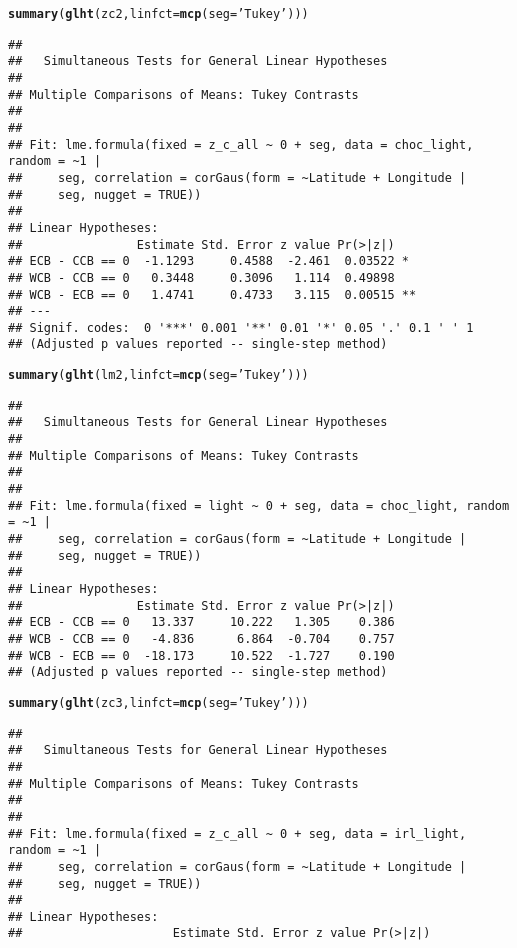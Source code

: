 \documentclass[letterpaper,12pt]{article}\usepackage[]{graphicx}\usepackage[]{color}
\makeatletter
\newcommand{\hlstr}[1]{\textcolor[rgb]{0.192,0.494,0.8}{#1}}%
\newcommand{\hlstd}[1]{\textcolor[rgb]{0.345,0.345,0.345}{#1}}%
\newcommand{\hlkwc}[1]{\textcolor[rgb]{0.333,0.667,0.333}{#1}}%
\newcommand{\hlkwd}[1]{\textcolor[rgb]{0.737,0.353,0.396}{\textbf{#1}}}%
\newenvironment{kframe}{%
 \def\at@end@of@kframe{}%
 \ifinner\ifhmode%
  \def\at@end@of@kframe{\end{minipage}}%
  \begin{minipage}{\columnwidth}%
 \fi\fi%
 \def\FrameCommand##1{\hskip\@totalleftmargin \hskip-\fboxsep
 \colorbox{shadecolor}{##1}\hskip-\fboxsep
     \hskip-\linewidth \hskip-\@totalleftmargin \hskip\columnwidth}%
 \MakeFramed {\advance\hsize-\width
   \@totalleftmargin\z@ \linewidth\hsize
   \@setminipage}}%
 {\par\unskip\endMakeFramed%
 \at@end@of@kframe}
\newenvironment{knitrout}{}{} %
\makeatother
\begin{document}
\begin{knitrout}
\begin{kframe}
\begin{alltt}
\hlkwd{summary}\hlstd{(}\hlkwd{glht}\hlstd{(zc2,} \hlkwc{linfct} \hlstd{=} \hlkwd{mcp}\hlstd{(}\hlkwc{seg} \hlstd{=} \hlstr{'Tukey'}\hlstd{)))}
\end{alltt}
\begin{verbatim}
## 
## 	 Simultaneous Tests for General Linear Hypotheses
## 
## Multiple Comparisons of Means: Tukey Contrasts
## 
## 
## Fit: lme.formula(fixed = z_c_all ~ 0 + seg, data = choc_light, random = ~1 | 
##     seg, correlation = corGaus(form = ~Latitude + Longitude | 
##     seg, nugget = TRUE))
## 
## Linear Hypotheses:
##                Estimate Std. Error z value Pr(>|z|)   
## ECB - CCB == 0  -1.1293     0.4588  -2.461  0.03522 * 
## WCB - CCB == 0   0.3448     0.3096   1.114  0.49898   
## WCB - ECB == 0   1.4741     0.4733   3.115  0.00515 **
## ---
## Signif. codes:  0 '***' 0.001 '**' 0.01 '*' 0.05 '.' 0.1 ' ' 1
## (Adjusted p values reported -- single-step method)
\end{verbatim}
\begin{alltt}
\hlkwd{summary}\hlstd{(}\hlkwd{glht}\hlstd{(lm2,} \hlkwc{linfct} \hlstd{=} \hlkwd{mcp}\hlstd{(}\hlkwc{seg} \hlstd{=} \hlstr{'Tukey'}\hlstd{)))}
\end{alltt}
\begin{verbatim}
## 
## 	 Simultaneous Tests for General Linear Hypotheses
## 
## Multiple Comparisons of Means: Tukey Contrasts
## 
## 
## Fit: lme.formula(fixed = light ~ 0 + seg, data = choc_light, random = ~1 | 
##     seg, correlation = corGaus(form = ~Latitude + Longitude | 
##     seg, nugget = TRUE))
## 
## Linear Hypotheses:
##                Estimate Std. Error z value Pr(>|z|)
## ECB - CCB == 0   13.337     10.222   1.305    0.386
## WCB - CCB == 0   -4.836      6.864  -0.704    0.757
## WCB - ECB == 0  -18.173     10.522  -1.727    0.190
## (Adjusted p values reported -- single-step method)
\end{verbatim}
\begin{alltt}
\hlkwd{summary}\hlstd{(}\hlkwd{glht}\hlstd{(zc3,} \hlkwc{linfct} \hlstd{=} \hlkwd{mcp}\hlstd{(}\hlkwc{seg} \hlstd{=} \hlstr{'Tukey'}\hlstd{)))}
\end{alltt}
\begin{verbatim}
## 
## 	 Simultaneous Tests for General Linear Hypotheses
## 
## Multiple Comparisons of Means: Tukey Contrasts
## 
## 
## Fit: lme.formula(fixed = z_c_all ~ 0 + seg, data = irl_light, random = ~1 | 
##     seg, correlation = corGaus(form = ~Latitude + Longitude | 
##     seg, nugget = TRUE))
## 
## Linear Hypotheses:
##                     Estimate Std. Error z value Pr(>|z|)

\end{verbatim}
\end{kframe}
\end{knitrout}
\end{document}
